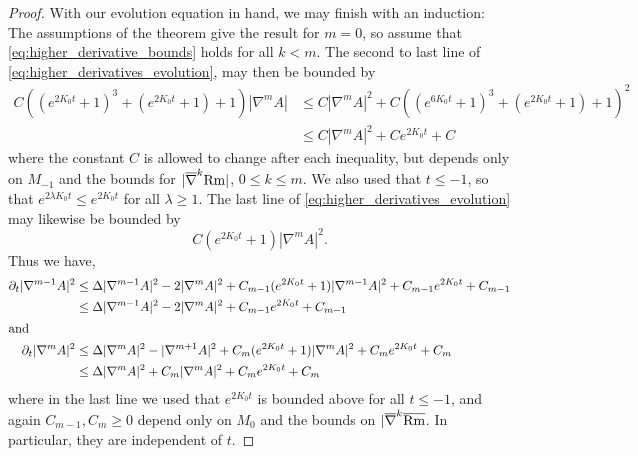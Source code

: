 \documentclass{amsart}
\begin{document}
\begin{proof}
With our evolution equation in hand, we may finish with an induction: The assumptions of the theorem give the result for \(m=0\), so assume that \eqref{eq:higher_derivative_bounds} holds for all \(k < m\). The second to last line of \eqref{eq:higher_derivatives_evolution}, may then be bounded by
\[
\begin{split}
C((e^{2K_0 t} + 1)^3 + (e^{2K_0t} + 1) + 1) |\nabla^m A| &\leq C |\nabla^m A|^2 + C ((e^{6K_0 t} + 1)^3 + (e^{2K_0t} + 1) + 1)^2 \\
&\leq C |\nabla^m A|^2 + C e^{2K_0 t} + C
\end{split}
\]
where the constant \(C\) is allowed to change after each inequality, but depends only on \(M_{-1}\) and the bounds for \(|\overline \nabla^k{\operatorname{Rm}}|\), \(0\leq k \leq m\). We also used that \(t \leq -1\), so that \(e^{2\lambda K_0 t} \leq e^{2K_0 t}\) for all \(\lambda \geq 1\). The last line of \eqref{eq:higher_derivatives_evolution} may likewise be bounded by
\[
C(e^{2K_0 t} + 1)|\nabla^m A|^2.
\]
Thus we have,
\begin{align*}
\partial_t |\nabla^{m-1} A|^2 &\leq \Delta |\nabla^{m-1} A|^2 - 2 |\nabla^m A|^2 + C_{m-1}(e^{2K_0t} + 1) |\nabla^{m-1} A|^2 + C_{m-1} e^{2K_0 t} + C_{m-1} \\
&\leq \Delta |\nabla^{m-1} A|^2 - 2 |\nabla^m A|^2 + C_{m-1} e^{2K_0 t} + C_{m-1} \\
\intertext{and}
\partial_t |\nabla^{m} A|^2 &\leq \Delta |\nabla^m A|^2  - |\nabla^{m+1} A|^2 + C_m(e^{2K_0t} + 1) |\nabla^m A|^2 + C_m e^{2K_0 t} + C_m \\
&\leq \Delta |\nabla^m A|^2 + C_m |\nabla^m A|^2 + C_m e^{2K_0 t} + C_m
\end{align*}
where in the last line we used that \(e^{2K_0 t}\) is bounded above for all \(t \leq -1\), and again \(C_{m-1},C_m \geq 0\) depend only on \(M_0\) and the bounds on \(|\overline{\nabla}^k \overline{\operatorname{Rm}}\). In particular, they are independent of \(t\).


\end{proof}
\end{document}
